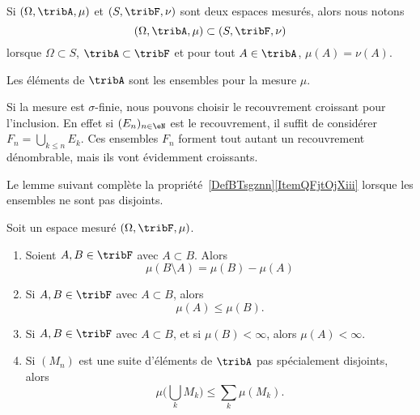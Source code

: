 Si \( (\Omega,\tribA,\mu)\) et \( (S,\tribF,\nu)\) sont deux espaces mesurés, alors nous notons
\begin{equation}
	(\Omega,\tribA,\mu)\subset (S,\tribF,\nu)
\end{equation}
lorsque \( \Omega\subset S\), \( \tribA\subset\tribF\) et pour tout \( A\in\tribA\), \( \mu(A)=\nu(A)\).

\begin{definition}\label{DefHGsQxHB}
	Les éléments de \( \tribA\) sont les ensembles  pour la mesure \( \mu\).
\end{definition}

Si la mesure est \( \sigma\)-finie, nous pouvons choisir le recouvrement croissant pour l'inclusion. En effet si \( (E_n)_{n\in \eN}\) est le recouvrement, il suffit de considérer \( F_n=\bigcup_{k\leq n}E_k\). Ces ensembles \( F_n\) forment tout autant un recouvrement dénombrable, mais ils vont évidemment croissants.

Le lemme suivant complète la propriété~\ref{DefBTsgznn}\ref{ItemQFjtOjXiii} lorsque les ensembles ne sont pas disjoints.
\begin{lemma} \label{LemPMprYuC}
	Soit un espace mesuré \( (\Omega,\tribF,\mu)\).
	\begin{enumerate}
		\item       \label{ITEMooSUIRooNDVOoB}
		      Soient \( A,B\in\tribF\) avec \( A\subset B\). Alors
		      \begin{equation}
			      \mu(B\setminus A)=\mu(B)-\mu(A)
		      \end{equation}
		\item       \label{ITEMooLEGKooWnYmlf}
		      Si \( A,B\in \tribF\) avec \( A\subset B\), alors
		      \begin{equation}
			      \mu(A)\leq \mu(B).
		      \end{equation}
		\item       \label{ITEMooMCNBooRGVGqA}
		      Si \( A,B\in \tribF\) avec \( A\subset B\), et si \( \mu(B)<\infty\), alors \( \mu(A)<\infty\).
		\item       \label{ITEMooABPYooFQEzqE}
		      Si \( (M_n)\) est une suite d'éléments de \( \tribA\) pas spécialement disjoints, alors
		      \begin{equation}\label{EqWWFooYPCTt}
			      \mu\big( \bigcup_kM_k \big)\leq \sum_{k}\mu(M_k).
		      \end{equation}
	\end{enumerate}
\end{lemma}

